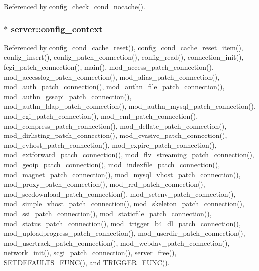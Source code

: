 Referenced by config\-\_\-check\-\_\-cond\-\_\-nocache().

\hypertarget{structserver_a134a4c19a77a4520eed497c021bb84ab}{
\subsubsection[{config\-\_\-context}]{$\ast$ server\-::config\-\_\-context}}\label{structserver_a134a4c19a77a4520eed497c021bb84ab}


Referenced by config\-\_\-cond\-\_\-cache\-\_\-reset(), config\-\_\-cond\-\_\-cache\-\_\-reset\-\_\-item(), config\-\_\-insert(), config\-\_\-patch\-\_\-connection(), config\-\_\-read(), connection\-\_\-init(), fcgi\-\_\-patch\-\_\-connection(), main(), mod\-\_\-access\-\_\-patch\-\_\-connection(), mod\-\_\-accesslog\-\_\-patch\-\_\-connection(), mod\-\_\-alias\-\_\-patch\-\_\-connection(), mod\-\_\-auth\-\_\-patch\-\_\-connection(), mod\-\_\-authn\-\_\-file\-\_\-patch\-\_\-connection(), mod\-\_\-authn\-\_\-gssapi\-\_\-patch\-\_\-connection(), mod\-\_\-authn\-\_\-ldap\-\_\-patch\-\_\-connection(), mod\-\_\-authn\-\_\-mysql\-\_\-patch\-\_\-connection(), mod\-\_\-cgi\-\_\-patch\-\_\-connection(), mod\-\_\-cml\-\_\-patch\-\_\-connection(), mod\-\_\-compress\-\_\-patch\-\_\-connection(), mod\-\_\-deflate\-\_\-patch\-\_\-connection(), mod\-\_\-dirlisting\-\_\-patch\-\_\-connection(), mod\-\_\-evasive\-\_\-patch\-\_\-connection(), mod\-\_\-evhost\-\_\-patch\-\_\-connection(), mod\-\_\-expire\-\_\-patch\-\_\-connection(), mod\-\_\-extforward\-\_\-patch\-\_\-connection(), mod\-\_\-flv\-\_\-streaming\-\_\-patch\-\_\-connection(), mod\-\_\-geoip\-\_\-patch\-\_\-connection(), mod\-\_\-indexfile\-\_\-patch\-\_\-connection(), mod\-\_\-magnet\-\_\-patch\-\_\-connection(), mod\-\_\-mysql\-\_\-vhost\-\_\-patch\-\_\-connection(), mod\-\_\-proxy\-\_\-patch\-\_\-connection(), mod\-\_\-rrd\-\_\-patch\-\_\-connection(), mod\-\_\-secdownload\-\_\-patch\-\_\-connection(), mod\-\_\-setenv\-\_\-patch\-\_\-connection(), mod\-\_\-simple\-\_\-vhost\-\_\-patch\-\_\-connection(), mod\-\_\-skeleton\-\_\-patch\-\_\-connection(), mod\-\_\-ssi\-\_\-patch\-\_\-connection(), mod\-\_\-staticfile\-\_\-patch\-\_\-connection(), mod\-\_\-status\-\_\-patch\-\_\-connection(), mod\-\_\-trigger\-\_\-b4\-\_\-dl\-\_\-patch\-\_\-connection(), mod\-\_\-uploadprogress\-\_\-patch\-\_\-connection(), mod\-\_\-userdir\-\_\-patch\-\_\-connection(), mod\-\_\-usertrack\-\_\-patch\-\_\-connection(), mod\-\_\-webdav\-\_\-patch\-\_\-connection(), network\-\_\-init(), scgi\-\_\-patch\-\_\-connection(), server\-\_\-free(), S\-E\-T\-D\-E\-F\-A\-U\-L\-T\-S\-\_\-\-F\-U\-N\-C(), and T\-R\-I\-G\-G\-E\-R\-\_\-\-F\-U\-N\-C().

